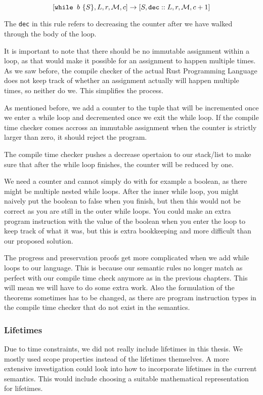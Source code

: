 $$[ \texttt{while } b~ \{ S \}, L, r, \mathcal{M}, c ] \to [ S, \texttt{dec}::L, r, \mathcal{M}, c+1 ]$$

The \texttt{dec} in this rule refers to decreasing the counter after we have walked through the body of the loop.

It is important to note that there should be no immutable assignment within a loop, as that would make it possible for an assignment to happen multiple times. As we saw before, the compile checker of the actual Rust Programming Language does not keep track of whether an assignment actually will happen multiple times, so  neither do we. This simplifies the process. 

As mentioned before, we add a counter to the tuple that will be incremented once we enter a while loop and decremented once we exit the while loop. If the compile time checker comes accross an immutable assignment when the counter is strictly larger than zero, it should reject the program. 

The compile time checker pushes a decrease opertaion to our stack/list to make sure that after the while loop finishes, the counter will be reduced by one. 

We need a counter and cannot simply do with for example a boolean, as there might be multiple nested while loops. After the inner while loop, you might naively put the boolean to false when you finish, but then this would not be correct as you are still in the outer while loops. You could make an extra program instruction with the value of the boolean when you enter the loop to keep track of what it was, but this is extra bookkeeping and more difficult than our proposed solution.

The progress and preservation proofs get more complicated when we add while loops to our language. This is because our semantic rules no longer match as perfect with our compile time check anymore as in the previous chapters. This will mean we will have to do some extra work. Also the formulation of the theorems sometimes has to be changed, as there are program instruction types in the compile time checker that do not exist in the semantics. 

\subsubsection*{Lifetimes}
Due to time constraints, we did not really include lifetimes in this thesis. We mostly used scope properties instead of the lifetimes themselves. A more extensive investigation could look into how to incorporate lifetimes in the current semantics. This would include choosing a suitable mathematical representation for lifetimes. 

